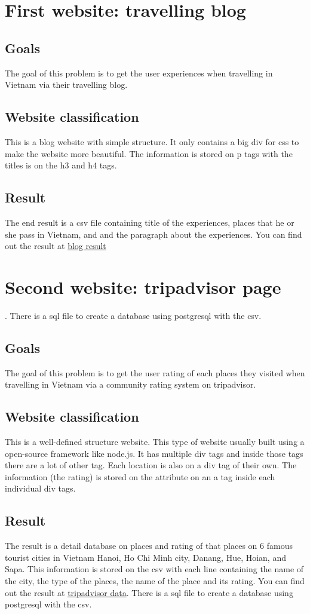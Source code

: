\documentclass[11pt,a4paper]{report}
\begin{document}
\section{First website: travelling blog}
	\subsection{Goals}
	The goal of this problem is to get the user experiences when travelling in Vietnam via their travelling blog.
	\subsection{Website classification}
	This is a blog website with simple structure. It only contains a big div for css to make the website more beautiful. The information is stored on p tags with the titles is on the h3 and h4 tags.
	\subsection{Result}
	The end result is a csv file containing title of the experiences, places that he or she pass in Vietnam, and and the paragraph about the experiences. You can find out the result at \href{https://github.com/lam1910/crawler-gr1/blob/master/world-travel-family/world-travel-family.csv}{blog result}
\section{Second website: tripadvisor page}. There is a sql file to create a database using postgresql with the csv.
	\subsection{Goals}
	The goal of this problem is to get the user rating of each places they visited when travelling in Vietnam via a community rating system on tripadvisor.
	\subsection{Website classification}
	This is a well-defined structure website. This type of website usually built using a open-source framework like node.js. It has multiple div tags and inside those tags there are a lot of other tag. Each location is also on a div tag of their own. The information (the rating) is stored on the attribute on an a tag inside each individual div tags.
	\subsection{Result}
	The result is a detail database on places and rating of that places on 6 famous tourist cities in Vietnam Hanoi, Ho Chi Minh city, Danang, Hue, Hoian, and Sapa. This information is stored on the csv with each line containing the name of the city, the type of the places, the name of the place and its rating. You can find out the result at \href{https://github.com/lam1910/crawler-gr1/blob/master/trip-advisor/trip-data.csv}{tripadvisor data}. There is a sql file to create a database using postgresql with the csv.
\end{document}
